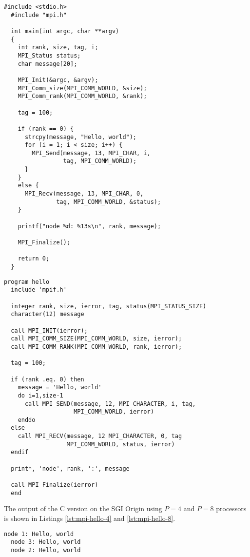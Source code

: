 \begin{lstlisting}[style=c, float, caption={Hello world MPI in C.}, label=lst:mpi-hello-c]
  #include <stdio.h>
  #include "mpi.h"

  int main(int argc, char **argv)
  {
    int rank, size, tag, i;
    MPI_Status status;
    char message[20];

    MPI_Init(&argc, &argv);
    MPI_Comm_size(MPI_COMM_WORLD, &size);
    MPI_Comm_rank(MPI_COMM_WORLD, &rank);

    tag = 100;

    if (rank == 0) {
      strcpy(message, "Hello, world");
      for (i = 1; i < size; i++) {
        MPI_Send(message, 13, MPI_CHAR, i,
                 tag, MPI_COMM_WORLD);
      }
    }
    else {
      MPI_Recv(message, 13, MPI_CHAR, 0,
               tag, MPI_COMM_WORLD, &status);
    }

    printf("node %d: %13s\n", rank, message);

    MPI_Finalize();

    return 0;
  }
\end{lstlisting}

\begin{lstlisting}[style=fortran, float, caption={Hello world MPI in Fortran.}, label=lst:mpi-hello-fortran]
  program hello
  include 'mpif.h'

  integer rank, size, ierror, tag, status(MPI_STATUS_SIZE)
  character(12) message

  call MPI_INIT(ierror);
  call MPI_COMM_SIZE(MPI_COMM_WORLD, size, ierror);
  call MPI_COMM_RANK(MPI_COMM_WORLD, rank, ierror);

  tag = 100;

  if (rank .eq. 0) then
    message = 'Hello, world'
    do i=1,size-1
      call MPI_SEND(message, 12, MPI_CHARACTER, i, tag,
                    MPI_COMM_WORLD, ierror)
    enddo
  else
    call MPI_RECV(message, 12 MPI_CHARACTER, 0, tag
                  MPI_COMM_WORLD, status, ierror)
  endif

  print*, 'node', rank, ':', message

  call MPI_Finalize(ierror)
  end
\end{lstlisting}

The output of the C version on the SGI Origin using $P=4$ and $P=8$ processors
is shown in Listings \ref{lst:mpi-hello-4} and \ref{lst:mpi-hello-8}.

\begin{lstlisting}[float, caption={Hello world MPI in C: $4$ processors.}, label=lst:mpi-hello-4]
  node 1: Hello, world
  node 3: Hello, world
  node 2: Hello, world
\end{lstlisting}

